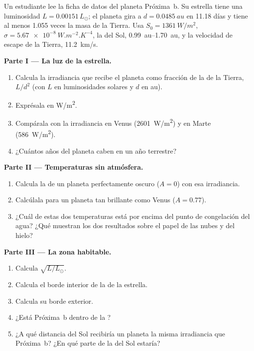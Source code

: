 \begin{problem}
\label{pb:g10:habitable-planet:1}
Un estudiante lee la ficha de datos del planeta Próxima~b. Su estrella tiene
una luminosidad $L = 0.00151\,L_\odot$; el planeta gira a
$d = \qty{0.0485}{au}$ en 11.18 días y tiene al menos 1.055 veces la masa de
la Tierra. Usa $S_0 = \qty{1361}{W/m^2}$,
$\sigma = \qty{5.67e-8}{W.m^{-2}.K^{-4}}$, la  del Sol,
\qtyrange{0.99}{1.70}{au}, y la velocidad de escape de la Tierra,
\qty{11.2}{km/s}.

\medskip
\noindent\textbf{Parte I --- La luz de la estrella.}
\begin{enumerate}
  \item Calcula la irradiancia que recibe el planeta como fracción de la de
        la Tierra, $L/d^2$ (con $L$ en luminosidades solares y $d$ en au).
  \item Exprésala en \unit{W/m^2}.
  \item Compárala con la irradiancia en Venus (\qty{2601}{W/m^2}) y en
        Marte (\qty{586}{W/m^2}).
  \item ¿Cuántos años del planeta caben en un año terrestre?
\end{enumerate}

\medskip
\noindent\textbf{Parte II --- Temperaturas sin atmósfera.}
\begin{enumerate}[resume]
  \item Calcula la  de un planeta perfectamente
        oscuro ($A = 0$) con esa irradiancia.
  \item Calcúlala para un planeta tan brillante como Venus ($A = 0.77$).
  \item ¿Cuál de estas dos temperaturas está por encima del punto de
        congelación del agua? ¿Qué muestran los dos resultados sobre el
        papel de las nubes y del hielo?
\end{enumerate}

\medskip
\noindent\textbf{Parte III --- La zona habitable.}
\begin{enumerate}[resume]
  \item Calcula $\sqrt{L/L_\odot}$.
  \item Calcula el borde interior de la  de la estrella.
  \item Calcula su borde exterior.
  \item ¿Está Próxima~b dentro de la ?
  \item ¿A qué distancia del Sol recibiría un planeta la misma irradiancia
        que Próxima~b? ¿En qué parte de la  del Sol estaría?
\end{enumerate}


\end{problem}
